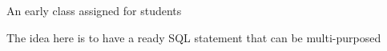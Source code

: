 
\begin{DoxyRefList}
\item[Class \mbox{\hyperlink{classams_1_1student}{ams.student}} ]\label{deprecated__deprecated000001}%
%
An early class assigned for students 
\item[Member \mbox{\hyperlink{classams_1_1student_aaf15213b221829a2c44c15a859af9da2}{ams.student.S\+Q\+L\+Student}} (String column, String table)]\label{deprecated__deprecated000002}%
%
 The idea here is to have a ready S\+QL statement that can be multi-\/purposed 
\end{DoxyRefList}